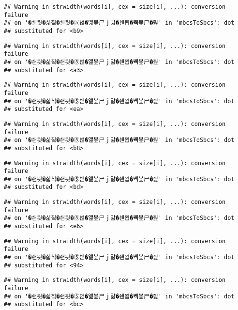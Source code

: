 \documentclass[]{article}
\begin{document}
\begin{verbatim}
## Warning in strwidth(words[i], cex = size[i], ...): conversion failure
## on '�쇈묏�싧칰�쇈묏�⑤벊�앮뵾尸ｊ맒�쇈묍�붹뵾尸�즲' in 'mbcsToSbcs': dot
## substituted for <b9>
\end{verbatim}

\begin{verbatim}
## Warning in strwidth(words[i], cex = size[i], ...): conversion failure
## on '�쇈묏�싧칰�쇈묏�⑤벊�앮뵾尸ｊ맒�쇈묍�붹뵾尸�즲' in 'mbcsToSbcs': dot
## substituted for <a3>
\end{verbatim}

\begin{verbatim}
## Warning in strwidth(words[i], cex = size[i], ...): conversion failure
## on '�쇈묏�싧칰�쇈묏�⑤벊�앮뵾尸ｊ맒�쇈묍�붹뵾尸�즲' in 'mbcsToSbcs': dot
## substituted for <ea>
\end{verbatim}

\begin{verbatim}
## Warning in strwidth(words[i], cex = size[i], ...): conversion failure
## on '�쇈묏�싧칰�쇈묏�⑤벊�앮뵾尸ｊ맒�쇈묍�붹뵾尸�즲' in 'mbcsToSbcs': dot
## substituted for <b8>
\end{verbatim}

\begin{verbatim}
## Warning in strwidth(words[i], cex = size[i], ...): conversion failure
## on '�쇈묏�싧칰�쇈묏�⑤벊�앮뵾尸ｊ맒�쇈묍�붹뵾尸�즲' in 'mbcsToSbcs': dot
## substituted for <bd>
\end{verbatim}

\begin{verbatim}
## Warning in strwidth(words[i], cex = size[i], ...): conversion failure
## on '�쇈묏�싧칰�쇈묏�⑤벊�앮뵾尸ｊ맒�쇈묍�붹뵾尸�즲' in 'mbcsToSbcs': dot
## substituted for <e6>
\end{verbatim}

\begin{verbatim}
## Warning in strwidth(words[i], cex = size[i], ...): conversion failure
## on '�쇈묏�싧칰�쇈묏�⑤벊�앮뵾尸ｊ맒�쇈묍�붹뵾尸�즲' in 'mbcsToSbcs': dot
## substituted for <94>
\end{verbatim}

\begin{verbatim}
## Warning in strwidth(words[i], cex = size[i], ...): conversion failure
## on '�쇈묏�싧칰�쇈묏�⑤벊�앮뵾尸ｊ맒�쇈묍�붹뵾尸�즲' in 'mbcsToSbcs': dot
## substituted for <bc>
\end{verbatim}
\end{document}
